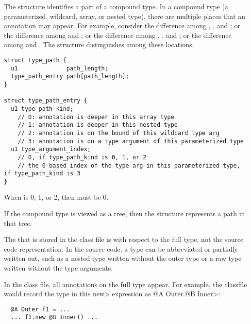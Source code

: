 \documentclass[10pt]{article}
\newcommand{\preverbnegspace}{\vspace{-5pt}}
\begin{document}


The  structure identifies a part of a compound type.
In a compound type (a parameterized, wildcard, array, or nested type),
there are multiple places that an annotation may appear.
For example, consider the difference among
,
, and
;
or the difference among
 and
;
or the difference among 
,
, and
;
or the difference among 
 and
.
The  structure distinguishes among these locations.

\begin{Verbatim}
struct type_path {
  u1              path_length;
  type_path_entry path[path_length];
}

struct type_path_entry {
  u1 type_path_kind;
    // 0: annotation is deeper in this array type
    // 1: annotation is deeper in this nested type
    // 2: annotation is on the bound of this wildcard type arg
    // 3: annotation is on a type argument of this parameterized type
  u1 type_argument_index;
    // 0, if type_path_kind is 0, 1, or 2
    // the 0-based index of the type arg in this parameterized type, if type_path_kind is 3
}
\end{Verbatim}


When  is 0, 1, or 2, then
 must be 0.

If the compound type is viewed as a tree, then 
the  structure represents a path in that tree.

The  that is stored in the class file is with respect to the full type, not the
source code representation.  In the source code, a type can be abbreviated
or partially written out, such as a nested type written without the outer
type or a raw type written without the type arguments.

In the class file, all annotations on the full type appear.  For example,
the classfile would record the type in this \<new> expression as
\<@A Outer.@B Inner>:

\preverbnegspace
\begin{Verbatim}
  @A Outer f1 = ...
  ... f1.new @B Inner() ...
\end{Verbatim}
\end{document}
